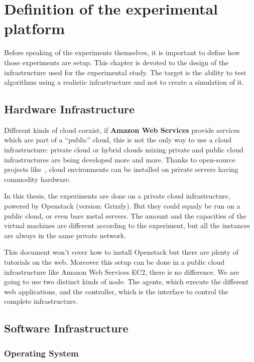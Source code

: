 \chapter{Definition of the experimental platform}
\label{chap:expsetup}

Before speaking of the experiments themselves, it is important to define how
those experiments are setup. This chapter is devoted to the design of
the infrastructure used for the experimental study. The target is the ability
to test algorithms using a realistic infrastructure and not to create a
simulation of it.

\section{Hardware Infrastructure}

Different kinds of cloud coexist, if \textbf{Amazon Web Services} provide
services which are part of a “public” cloud, this is not the only way to use a
cloud infrastructure: private cloud or hybrid clouds mixing private and public
cloud infrastructures are being developed more and more. Thanks to open-source
projects like~\cite{websiteOpenstack}, cloud environments can be installed on
private servers having commodity hardware.

In this thesis, the experiments are done on a private cloud
infrastructure, powered by Openstack (version: Grizzly). But they could
equaly be run on a public cloud, or even bare metal servers. The amount
and the capacities of the virtual machines are different according to the
experiment, but all the instances are always in the same private network.

This document won't cover how to install Openstack but there are plenty of
tutorials on the web. Moreover this setup can be done in a public cloud
infrastructure like Amazon Web Services EC2, there is no difference. We are
going to use two distinct kinds of node. The agents, which execute the
different web applications, and the controller, which is the interface to
control the complete infrastructure.

\section{Software Infrastructure}
\subsection{Operating System}

